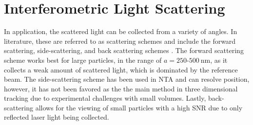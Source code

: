 







\clearpage
\section{Interferometric Light Scattering}

In application, the scattered light can be collected from a variety of angles. In literature, these are referred to as scattering schemes and include the forward scattering, side-scattering, and back scattering schemes \cite{olsenBridgingSingleParticleCharacterisation}. The forward scattering scheme works best for large particles, in the range of $a=250$-$\SI{500}{\nm}$, as it collects a weak amount of scattered light, which is dominated by the reference beam. The side-scattering scheme has been used in NTA and can resolve position, however, it has not been favored as the the main method in three dimensional tracking due to experimental challenges with small volumes. Lastly, back-scattering allows for the viewing of small particles with a high SNR due to only reflected laser light being collected. 



